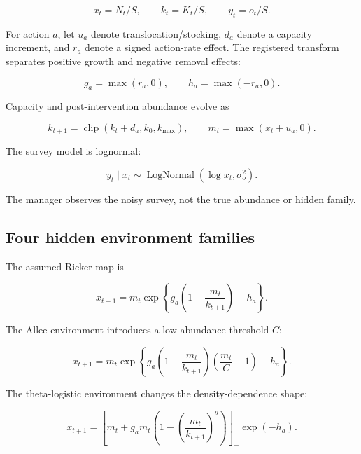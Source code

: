 \documentclass[11pt]{article}
\begin{document}
\begin{equation}
x_t=N_t/S,\qquad k_t=K_t/S,\qquad y_t=o_t/S.
\end{equation}

For action $a$, let $u_a$ denote translocation/stocking, $d_a$ denote a capacity increment, and
$r_a$ denote a signed action-rate effect. The registered transform separates positive growth and
negative removal effects:

\begin{equation}
g_a=\max(r_a,0),\qquad h_a=\max(-r_a,0).
\end{equation}

Capacity and post-intervention abundance evolve as

\begin{equation}
k_{t+1}=\operatorname{clip}(k_t+d_a,k_0,k_{\max}),
\qquad m_t=\max(x_t+u_a,0).
\end{equation}

The survey model is lognormal:

\begin{equation}
y_t\mid x_t\sim\operatorname{LogNormal}(\log x_t,\sigma_o^2).
\end{equation}

The manager observes the noisy survey, not the true abundance or hidden family.

\subsection{Four hidden environment families}

The assumed Ricker map is

\begin{equation}
x_{t+1}=m_t\exp\left\{g_a\left(1-\frac{m_t}{k_{t+1}}\right)-h_a\right\}.
\end{equation}

The Allee environment introduces a low-abundance threshold $C$:

\begin{equation}
x_{t+1}=m_t\exp\left\{g_a\left(1-\frac{m_t}{k_{t+1}}\right)
\left(\frac{m_t}{C}-1\right)-h_a\right\}.
\end{equation}

The theta-logistic environment changes the density-dependence shape:

\begin{equation}
x_{t+1}=\left[m_t+g_am_t\left(1-
\left(\frac{m_t}{k_{t+1}}\right)^\theta\right)\right]_+\exp(-h_a).
\end{equation}
\end{document}
